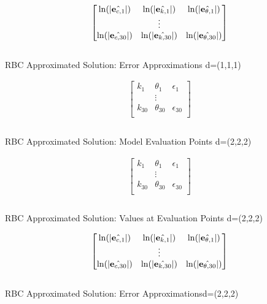 \documentclass[12pt]{article}
\begin{document}
 \begin{table}
   \centering
  
   \begin{gather*}
\forEstErr
\\
%   
   \end{gather*}\\
   \caption{RBC Approximated Solution: Error Approximations\label{esterrunkA} d=(1,1,1)}
 \end{table}


\begin{table}
  \centering
  
\begin{gather*}
  \begin{bmatrix}
    k_1&\theta_1&\epsilon_1\\
&\vdots\\
    k_{30}&\theta_{30}&\epsilon_{30}\\
  \end{bmatrix}\\
%  
\end{gather*}\\
  \caption{RBC Approximated Solution: Model Evaluation Points \label{evalpunkB} d=(2,2,2)}
\end{table}

\begin{table}
  \centering
  
\begin{gather*}
  \begin{bmatrix}
    k_1&\theta_1&\epsilon_1\\
&\vdots\\
    k_{30}&\theta_{30}&\epsilon_{30}\\
  \end{bmatrix}\\
%  
\end{gather*}\\
  \caption{RBC Approximated Solution: Values at Evaluation Points \label{valatunkB}d=(2,2,2)}
\end{table}



 \begin{table}
   \centering
  
   \begin{gather*}
\forEstErr\\
%   
   \end{gather*}\\
   \caption{RBC Approximated Solution: Error Approximations\label{esterrunkB}d=(2,2,2)}
 \end{table}
\end{document}

